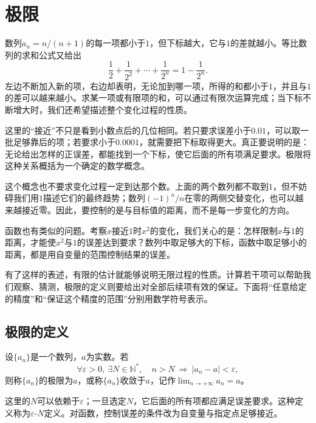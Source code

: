 \newpage
\section{极限}
\label{sec:analysis-limits}
数列\(a_n=n/(n+1)\)的每一项都小于\(1\)，但下标越大，它与\(1\)的差就越小。等比数列的求和公式又给出
\begin{equation*}
 \frac12+\frac1{2^2}+\cdots+\frac1{2^n}=1-\frac1{2^n}.
\end{equation*}
左边不断加入新的项，右边却表明，无论加到哪一项，所得的和都小于\(1\)，并且与\(1\)的差可以越来越小。求某一项或有限项的和，可以通过有限次运算完成；当下标不断增大时，我们还希望描述整个变化过程的性质。

这里的“接近”不只是看到小数点后的几位相同。若只要求误差小于\(0.01\)，可以取一批足够靠后的项；若要求小于\(0.0001\)，就需要把下标取得更大。真正要说明的是：无论给出怎样的正误差，都能找到一个下标，使它后面的所有项满足要求。极限将这种关系概括为一个确定的数学概念。

这个概念也不要求变化过程一定到达那个数。上面的两个数列都不取到\(1\)，但不妨碍我们用\(1\)描述它们的最终趋势；数列\((-1)^n/n\)在零的两侧交替变化，也可以越来越接近零。因此，要控制的是与目标值的距离，而不是每一步变化的方向。

函数也有类似的问题。考察\(x\)接近\(1\)时\(x^2\)的变化，我们关心的是：怎样限制\(x\)与\(1\)的距离，才能使\(x^2\)与\(1\)的误差达到要求？数列中取足够大的下标，函数中取足够小的距离，都是用自变量的范围控制结果的误差。

有了这样的表述，有限的估计就能够说明无限过程的性质。计算若干项可以帮助我们观察、猜测，极限的定义则要给出对全部后续项有效的保证。下面将“任意给定的精度”和“保证这个精度的范围”分别用数学符号表示。

\subsection{极限的定义}
\begin{definition}[数列的极限]
设\(\{a_n\}\)是一个数列，\(a\)为实数。若
\begin{equation}\label{eq:analysis-sequence-limit-definition}
 \forall\varepsilon>0,\ \exists N\in\mathbb{N}^{*},\quad
 n>N\ \Longrightarrow\ |a_n-a|<\varepsilon,
\end{equation}
则称\(\{a_n\}\)的极限为\(a\)，或称\(\{a_n\}\){\heiti{}收敛于}\(a\)，记作\(\lim_{n\to+\infty}a_n=a\)。
\end{definition}

这里的\(N\)可以依赖于\(\varepsilon\)；一旦选定\(N\)，它后面的所有项都应满足误差要求。这种定义称为{\heiti{}\(\varepsilon\)-\(N\)定义}。对函数，控制误差的条件改为自变量与指定点足够接近。

